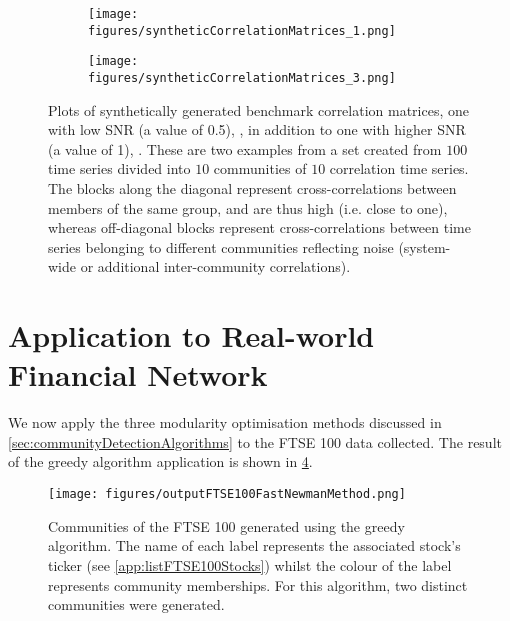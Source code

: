 \begin{figure}
	\centering
	\begin{subfigure}{.5\textwidth}
		\centering
		\texttt{[image: figures/syntheticCorrelationMatrices\_1.png]}
		\caption{}
		\label{fig:benchmarkCorrelationMatrix1}
	\end{subfigure}%
	\begin{subfigure}{.5\textwidth}
		\centering
		\texttt{[image: figures/syntheticCorrelationMatrices\_3.png]}
		\caption{}
		\label{fig:benchmarkCorrelationMatrix3}
	\end{subfigure}
	\caption[Plots of synthetically generated benchmark correlation matrices]{\label{fig:benchmarkCorrelationMatrices} Plots of synthetically generated benchmark correlation matrices, one with low SNR (a value of 0.5), , in addition to one with higher SNR (a value of 1), . These are two examples from a set created from $100$ time series divided into $10$ communities of $10$ correlation time series. The blocks along the diagonal represent cross-correlations between members of the same group, and are thus high (i.e. close to one), whereas off-diagonal blocks represent cross-correlations between time series belonging to different communities reflecting noise (system-wide or additional inter-community correlations).}
\end{figure}


\section{Application to Real-world Financial Network}
\label{sec:applicationToRealWorldFinancialNetwork}

We now apply the three modularity optimisation methods discussed in \cref{sec:communityDetectionAlgorithms} to the FTSE 100 data collected.
The result of the greedy algorithm application is shown in \cref{fig:outputCommunitiesGreedy}.

\begin{figure}
	\centering
	\texttt{[image: figures/outputFTSE100FastNewmanMethod.png]}
	\caption[Communities of the FTSE 100 data generated using the greedy algorithm.]{\label{fig:outputCommunitiesGreedy} Communities of the FTSE 100 generated using the greedy algorithm. The name of each label represents the associated stock's ticker (see \cref{app:listFTSE100Stocks}) whilst the colour of the label represents community memberships. For this algorithm, two distinct communities were generated.}
\end{figure}

